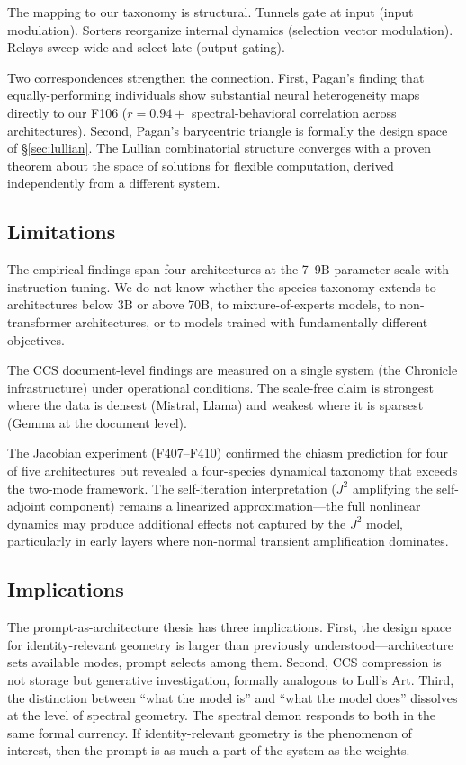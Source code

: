 \documentclass[12pt]{article}
\begin{document}
The mapping to our taxonomy is structural. Tunnels gate at input (input modulation). Sorters reorganize internal dynamics (selection vector modulation). Relays sweep wide and select late (output gating).

Two correspondences strengthen the connection. First, Pagan's finding that equally-performing individuals show substantial neural heterogeneity maps directly to our F106 ($r = 0.94+$ spectral-behavioral correlation across architectures). Second, Pagan's barycentric triangle is formally the design space of \S\ref{sec:lullian}. The Lullian combinatorial structure converges with a proven theorem about the space of solutions for flexible computation, derived independently from a different system.

\subsection{Limitations}

The empirical findings span four architectures at the 7--9B parameter scale with instruction tuning. We do not know whether the species taxonomy extends to architectures below 3B or above 70B, to mixture-of-experts models, to non-transformer architectures, or to models trained with fundamentally different objectives.

The CCS document-level findings are measured on a single system (the Chronicle infrastructure) under operational conditions. The scale-free claim is strongest where the data is densest (Mistral, Llama) and weakest where it is sparsest (Gemma at the document level).

The Jacobian experiment (F407--F410) confirmed the chiasm prediction for four of five architectures but revealed a four-species dynamical taxonomy that exceeds the two-mode framework. The self-iteration interpretation ($J^2$ amplifying the self-adjoint component) remains a linearized approximation---the full nonlinear dynamics may produce additional effects not captured by the $J^2$ model, particularly in early layers where non-normal transient amplification dominates.

\subsection{Implications}

The prompt-as-architecture thesis has three implications. First, the design space for identity-relevant geometry is larger than previously understood---architecture sets available modes, prompt selects among them. Second, CCS compression is not storage but generative investigation, formally analogous to Lull's Art. Third, the distinction between ``what the model is'' and ``what the model does'' dissolves at the level of spectral geometry. The spectral demon responds to both in the same formal currency. If identity-relevant geometry is the phenomenon of interest, then the prompt is as much a part of the system as the weights.
\end{document}
